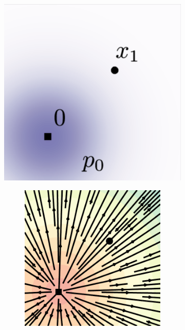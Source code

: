 \documentclass{article}
\begin{document}
\begin{figure}
\centering
\begin{subfigure}[t]{0.0989\linewidth}
\includegraphics[width=\linewidth]{figures/plots/2d_vf_reference.png}
\end{subfigure}
\hfill
\begin{subfigure}[t]{0.42\linewidth}
\centering
    \begin{subfigure}[t]{0.23\linewidth}
        \centering
        \includegraphics[width=\linewidth]{figures/plots/2d_vf_score_dif_0.pdf}

\end{subfigure}
\end{subfigure}
\end{figure}
\end{document}
